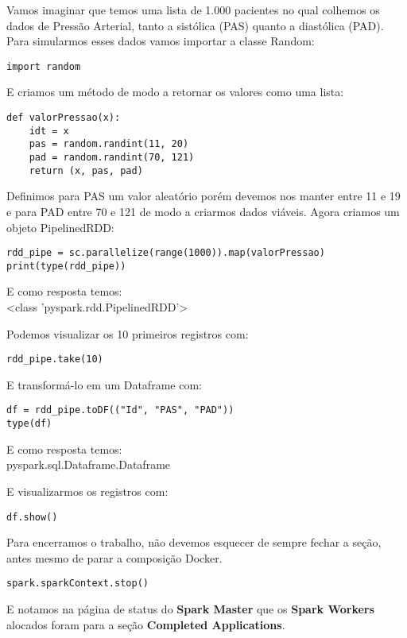 Vamos imaginar que temos uma lista de 1.000 pacientes no qual colhemos os dados de Pressão Arterial, tanto a sistólica (PAS) quanto a diastólica (PAD). Para simularmos esses dados vamos importar a classe Random:
\begin{lstlisting}[]
import random
\end{lstlisting}

E criamos um método de modo a retornar os valores como uma lista:
\begin{lstlisting}[]
def valorPressao(x):
    idt = x
    pas = random.randint(11, 20)
    pad = random.randint(70, 121)
    return (x, pas, pad)
\end{lstlisting}

Definimos para PAS um valor aleatório porém devemos nos manter entre 11 e 19 e para PAD entre 70 e 121 de modo a criarmos dados viáveis. Agora criamos um objeto PipelinedRDD:
\begin{lstlisting}[]
rdd_pipe = sc.parallelize(range(1000)).map(valorPressao)
print(type(rdd_pipe))
\end{lstlisting}

E como resposta temos: \\
{\ttfamily <class 'pyspark.rdd.PipelinedRDD'>}

Podemos visualizar os 10 primeiros registros com:
\begin{lstlisting}[]
rdd_pipe.take(10)
\end{lstlisting}

E transformá-lo em um Dataframe com:
\begin{lstlisting}[]
df = rdd_pipe.toDF(("Id", "PAS", "PAD"))
type(df)
\end{lstlisting}

E como resposta temos: \\
{\ttfamily pyspark.sql.Dataframe.Dataframe}

E visualizarmos os registros com:
\begin{lstlisting}[]
df.show()
\end{lstlisting}

Para encerramos o trabalho, não devemos esquecer de sempre fechar a seção, antes mesmo de parar a composição Docker.
\begin{lstlisting}[]
spark.sparkContext.stop()
\end{lstlisting}

E notamos na página de status do \textbf{Spark Master} que os \textbf{Spark Workers} alocados foram para a seção \textbf{Completed Applications}.

